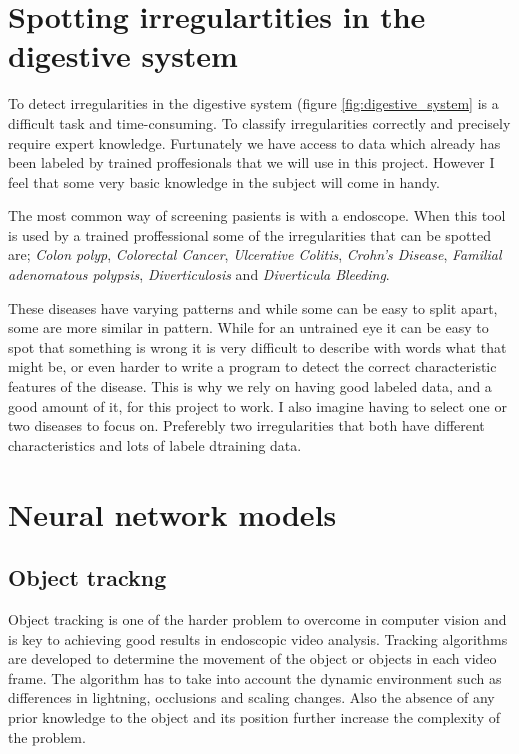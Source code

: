 \documentclass[english, a4paper]{report}
\begin{document}
\section{Spotting irregulartities in the digestive system}

To detect irregularities in the digestive system (figure \ref{fig:digestive_system} is a difficult task and time-consuming. To classify irregularities correctly and precisely require expert knowledge. Furtunately we have access to data which already has been labeled by trained proffesionals that we will use in this project. However I feel that some very basic knowledge in the subject will come in handy.

The most common way of screening pasients is with a endoscope. When this tool is used by a trained proffessional some of the irregularities that can be spotted are; \textit{Colon polyp}, \textit{Colorectal Cancer}, \textit{Ulcerative Colitis}, \textit{Crohn's Disease}, \textit{Familial adenomatous polypsis}, \textit{Diverticulosis} and \textit{Diverticula Bleeding}. 

These diseases have varying patterns and while some can be easy to split apart, some are more similar in pattern. While for an untrained eye it can be easy to spot that something is wrong it is very difficult to describe with words what that might be, or even harder to write a program to detect the correct characteristic features of the disease. This is why we rely on having good labeled data, and a good amount of it, for this project to work. I also imagine having to select one or two diseases to focus on. Preferebly two irregularities that both have different characteristics and lots of labele dtraining data.






\section{Neural network models}



\subsection{Object trackng}
Object tracking is one of the harder problem to overcome in computer vision and is key to achieving good results in endoscopic video analysis. Tracking algorithms are developed to determine the movement of the object or objects in each video frame. The algorithm has to take into account the dynamic environment such as differences in lightning, occlusions and scaling changes. Also the absence of any prior knowledge to the object and its position further increase the complexity of the problem.
\end{document}
